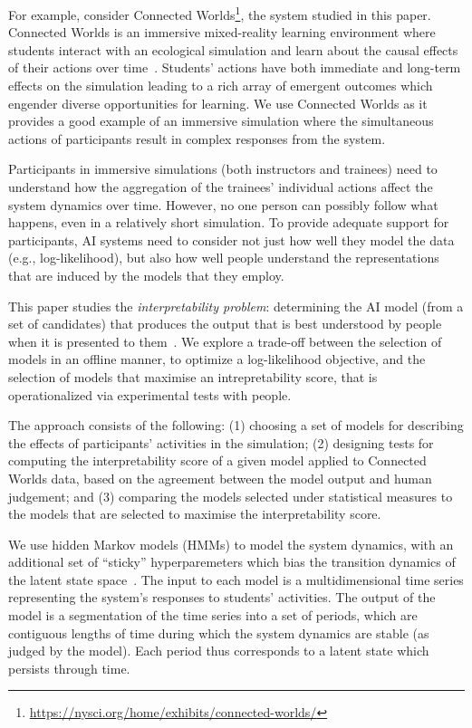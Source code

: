 \documentclass[letterpaper]{article} %
\begin{document}
For example, consider Connected Worlds\footnote{\url{https://nysci.org/home/exhibits/connected-worlds/}},  the system studied in this paper. Connected Worlds is
an immersive mixed-reality learning environment
where students interact with an ecological simulation and learn about the causal effects of their actions over time~\cite{mallavarapu2019connect}.
Students' actions have both immediate and long-term effects on the simulation leading to a rich array of emergent outcomes which engender diverse opportunities for learning.
We use Connected Worlds as it provides a good example of an immersive simulation where the simultaneous actions of participants result in complex responses from the system.

Participants in immersive simulations (both instructors and trainees) need to understand how the aggregation of the trainees' individual actions affect the system dynamics over time.
However, no one person can possibly follow what happens, even in a relatively short simulation.
To provide adequate support for participants, AI systems need to consider not just how well they model the data (e.g., log-likelihood), but also how well people understand the representations that are induced by the models that they employ.

This paper studies the \emph{interpretability problem}: determining the AI model (from a set of candidates) that produces the output that is  best understood by people when it is presented  to them~\cite{gilpin2018explaining,doshi2017roadmap,caruana2015intelligible}.
We explore a trade-off between the selection of models in an offline manner, to optimize a log-likelihood objective, and the selection of models that maximise an intrepretability score, that is operationalized via experimental tests with people.

The approach consists of the following:
(1) choosing a set of models for describing the effects of participants' activities in the simulation;
(2) designing tests for computing the interpretability score of a given model applied to Connected Worlds data, based on the agreement between the model output and human judgement; and
(3) comparing the models selected under statistical measures to the models that are selected to maximise the interpretability score.


We use hidden Markov models (HMMs) to model the system dynamics, with an additional set of ``sticky'' hyperparemeters which bias the transition dynamics of the latent state space~\cite{fox2008hdp}.
The input to each model is a multidimensional time series representing the system's responses to students' activities.
The output of the model is a segmentation of the time series into a set of periods, which are contiguous lengths of time during which the system
dynamics are stable (as judged by the model). Each period thus corresponds to a latent state which persists through time.
\end{document}
